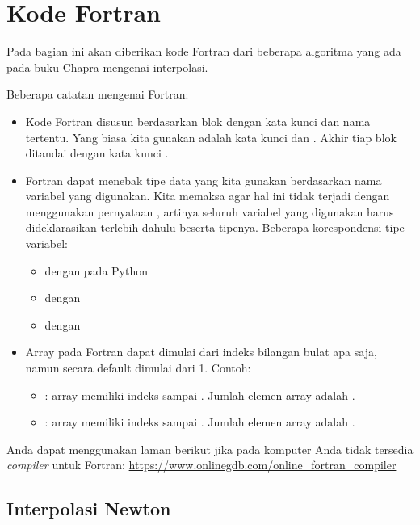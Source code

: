\section{Kode Fortran}

Pada bagian ini akan diberikan kode Fortran dari beberapa algoritma yang
ada pada buku Chapra mengenai interpolasi.

Beberapa catatan mengenai Fortran:
\begin{itemize}
\item Kode Fortran disusun berdasarkan blok dengan kata kunci dan nama tertentu.
Yang biasa kita gunakan adalah kata kunci  dan .
Akhir tiap blok ditandai dengan kata kunci .
\item Fortran dapat menebak tipe data yang kita gunakan berdasarkan nama variabel
yang digunakan. Kita memaksa agar hal ini tidak terjadi dengan menggunakan pernyataan
, artinya seluruh variabel yang digunakan harus dideklarasikan
terlebih dahulu beserta tipenya. Beberapa korespondensi tipe variabel:
  \begin{itemize}
  \item {} dengan  pada Python
  \item {} dengan 
  \item {} dengan 
  \end{itemize}
\item Array pada Fortran dapat dimulai dari indeks bilangan bulat apa saja, namun secara default
dimulai dari 1. Contoh:
  \begin{itemize}
  \item {}: array  memiliki indeks 
  sampai . Jumlah elemen array adalah .
  \item {}: array  memiliki indeks 
  sampai . Jumlah elemen array adalah .
  \end{itemize}
\end{itemize}

Anda dapat menggunakan laman berikut jika pada komputer Anda tidak tersedia
\textit{compiler} untuk Fortran:
{\footnotesize \url{https://www.onlinegdb.com/online_fortran_compiler}}

\subsection{Interpolasi Newton}

